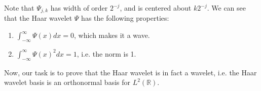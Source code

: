 \documentclass[2pt]{amsart}
\theoremstyle{theorem} %
\theoremstyle{definition}
\theoremstyle{example}
\theoremstyle{remark}
\numberwithin{equation}{section}
\newcommand{\R}{\mathbb{R}}
\begin{document}
Note that $ \varPsi_{j,k} $ has width of order $ 2^{-j} $, and is centered about $ k 2^{-j} $. We can see that the Haar wavelet $ \varPsi $ has the following properties:
\begin{enumerate}
	\item $ \int_{-\infty}^{\infty} \varPsi(x)dx = 0 $, which makes it a wave.
	\item  $ \int_{-\infty}^{\infty} \varPsi(x)^2dx = 1 $, i.e. the norm is 1.
\end{enumerate}

Now, our task is to prove that the Haar wavelet is in fact a wavelet, i.e. the Haar wavelet basis is an orthonormal basis for $ L^2(\R) $.


	
\end{document}
